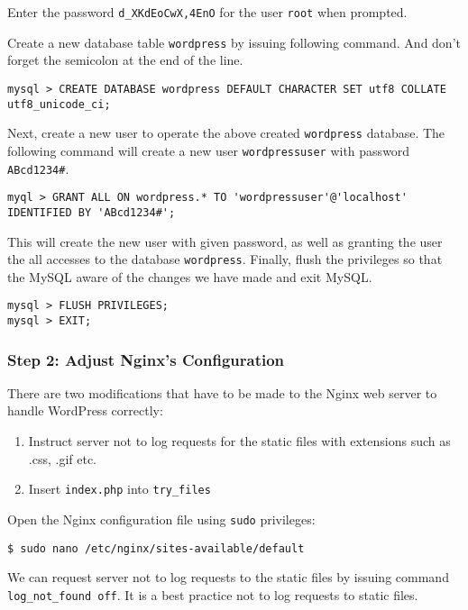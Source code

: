 Enter the password \texttt{d\_XKdEoCwX,4EnO} for the user \texttt{root} when prompted.

Create a new database table \texttt{wordpress} by issuing following command. And don't forget the semicolon at the end of the line.
\begin{lstlisting}
mysql > CREATE DATABASE wordpress DEFAULT CHARACTER SET utf8 COLLATE utf8_unicode_ci;
\end{lstlisting}

Next, create a new user to operate the above created \texttt{wordpress} database. The following command will create a new user \texttt{wordpressuser} with password \texttt{ABcd1234\#}.

\begin{lstlisting}
myql > GRANT ALL ON wordpress.* TO 'wordpressuser'@'localhost' IDENTIFIED BY 'ABcd1234#';
\end{lstlisting}

This will create the new user with given password, as well as granting the user the all accesses to the database \texttt{wordpress}. Finally, flush the privileges so that the MySQL aware of the changes we have made and exit MySQL.

\begin{lstlisting}
mysql > FLUSH PRIVILEGES;
mysql > EXIT;
\end{lstlisting}


\subsubsection*{Step 2: Adjust Nginx's Configuration}
There are two modifications that have to be made to the Nginx web server to handle WordPress correctly:
\begin{enumerate}
\item Instruct server not to log requests for the static files with extensions such as .css, .gif etc.
\item Insert \texttt{index.php} into \texttt{try\_files}
\end{enumerate}

Open the Nginx configuration file using \texttt{sudo} privileges:
\begin{lstlisting}
$ sudo nano /etc/nginx/sites-available/default
\end{lstlisting}

We can request server not to log requests to the static files by issuing command {\tt log\_not\_found off}. It is a best practice not to log requests to static files.

